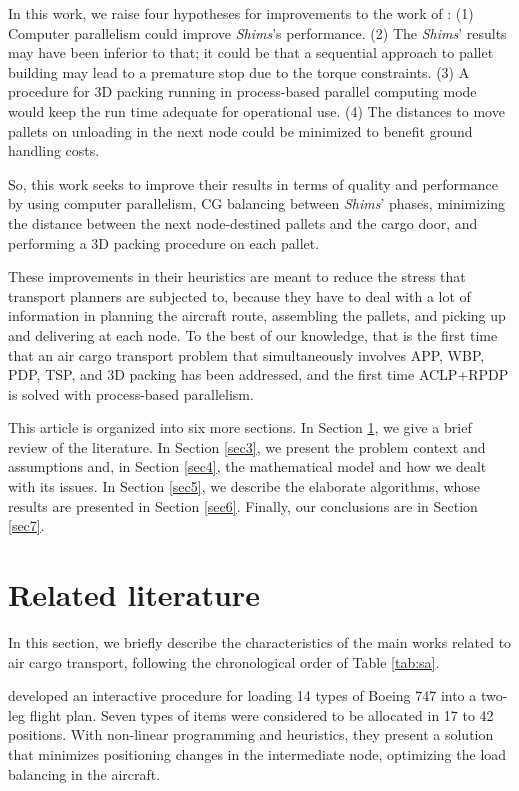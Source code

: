 \documentclass[preprint,authoryear]{elsarticle}
\begin{document}
In this work, we raise four hypotheses for improvements to the work of \cite{MesquitaSanches2023}: 
(1) Computer parallelism could improve {\it Shims}'s performance.
(2) The {\it Shims}' results may have been inferior to that; it could be that a sequential approach to pallet building may lead to a premature stop due to the torque constraints.
(3) A procedure for 3D packing running in process-based parallel computing mode would keep the run time adequate for operational use.
(4) The distances to move pallets on unloading in the next node could be minimized to benefit ground handling costs.


So, this work seeks to improve their results in terms of quality and performance by using computer parallelism, CG balancing between {\it Shims}' phases, minimizing the distance between the next node-destined pallets and the cargo door, and performing a 3D packing procedure on each pallet.

These improvements in their heuristics are meant to reduce the stress that transport planners are subjected to, because they have to deal with a lot of information in planning the aircraft route, assembling the pallets, and picking up and delivering at each node. To the best of our knowledge, that is the first time that an air cargo transport problem that simultaneously involves APP, WBP, PDP, TSP, and 3D packing has been addressed, and the first time ACLP+RPDP is solved with process-based parallelism.

This article is organized into six more sections. In Section \ref{sec2}, we give a brief review of the literature. In Section \ref{sec3}, we present the problem context and assumptions and, in Section \ref{sec4}, the mathematical model and how we dealt with its issues. In Section \ref{sec5}, we describe the elaborate algorithms, whose results are presented in Section \ref{sec6}. Finally, our conclusions are in Section \ref{sec7}.


\section{Related literature}
\label{sec2}

In this section, we briefly describe the characteristics of the main works related to air cargo transport, following the chronological order of Table \ref{tab:sa}.

\cite{LarsenMikkelsen1979} developed an interactive procedure for loading 14 types of Boeing 747 into a two-leg flight plan. Seven types of items were considered to be allocated in 17 to 42 positions. With non-linear programming and heuristics, they present a solution that minimizes positioning changes in the intermediate node, optimizing the load balancing in the aircraft.
\end{document}
